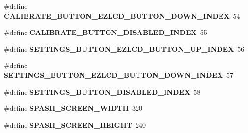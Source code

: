 \begin{DoxyCompactItemize}
\item 
\hypertarget{group__ez_l_c_d__103__user__config_ga820541eddfecebde95c946baaddbfcad}{\#define {\bfseries C\-A\-L\-I\-B\-R\-A\-T\-E\-\_\-\-B\-U\-T\-T\-O\-N\-\_\-\-E\-Z\-L\-C\-D\-\_\-\-B\-U\-T\-T\-O\-N\-\_\-\-D\-O\-W\-N\-\_\-\-I\-N\-D\-E\-X}~54}\label{group__ez_l_c_d__103__user__config_ga820541eddfecebde95c946baaddbfcad}

\item 
\hypertarget{group__ez_l_c_d__103__user__config_gaca421768a9acb47ecfdf03ca96943d5f}{\#define {\bfseries C\-A\-L\-I\-B\-R\-A\-T\-E\-\_\-\-B\-U\-T\-T\-O\-N\-\_\-\-D\-I\-S\-A\-B\-L\-E\-D\-\_\-\-I\-N\-D\-E\-X}~55}\label{group__ez_l_c_d__103__user__config_gaca421768a9acb47ecfdf03ca96943d5f}

\item 
\hypertarget{group__ez_l_c_d__103__user__config_ga2ac40a05ed7ec962ffba689213441890}{\#define {\bfseries S\-E\-T\-T\-I\-N\-G\-S\-\_\-\-B\-U\-T\-T\-O\-N\-\_\-\-E\-Z\-L\-C\-D\-\_\-\-B\-U\-T\-T\-O\-N\-\_\-\-U\-P\-\_\-\-I\-N\-D\-E\-X}~56}\label{group__ez_l_c_d__103__user__config_ga2ac40a05ed7ec962ffba689213441890}

\item 
\hypertarget{group__ez_l_c_d__103__user__config_ga6ed2f3dbf0958e7d58852aa7732bed0e}{\#define {\bfseries S\-E\-T\-T\-I\-N\-G\-S\-\_\-\-B\-U\-T\-T\-O\-N\-\_\-\-E\-Z\-L\-C\-D\-\_\-\-B\-U\-T\-T\-O\-N\-\_\-\-D\-O\-W\-N\-\_\-\-I\-N\-D\-E\-X}~57}\label{group__ez_l_c_d__103__user__config_ga6ed2f3dbf0958e7d58852aa7732bed0e}

\item 
\hypertarget{group__ez_l_c_d__103__user__config_ga8ff73717a472822df98204c88112df1f}{\#define {\bfseries S\-E\-T\-T\-I\-N\-G\-S\-\_\-\-B\-U\-T\-T\-O\-N\-\_\-\-D\-I\-S\-A\-B\-L\-E\-D\-\_\-\-I\-N\-D\-E\-X}~58}\label{group__ez_l_c_d__103__user__config_ga8ff73717a472822df98204c88112df1f}

\item 
\hypertarget{group__ez_l_c_d__103__user__config_ga5e0fd6e9e1e738454fbb0aa4075f55df}{\#define {\bfseries S\-P\-A\-S\-H\-\_\-\-S\-C\-R\-E\-E\-N\-\_\-\-W\-I\-D\-T\-H}~320}\label{group__ez_l_c_d__103__user__config_ga5e0fd6e9e1e738454fbb0aa4075f55df}

\item 
\hypertarget{group__ez_l_c_d__103__user__config_gad6b2fbfbd2c16559dc599c4537acd146}{\#define {\bfseries S\-P\-A\-S\-H\-\_\-\-S\-C\-R\-E\-E\-N\-\_\-\-H\-E\-I\-G\-H\-T}~240}\label{group__ez_l_c_d__103__user__config_gad6b2fbfbd2c16559dc599c4537acd146}


\end{DoxyCompactItemize}
